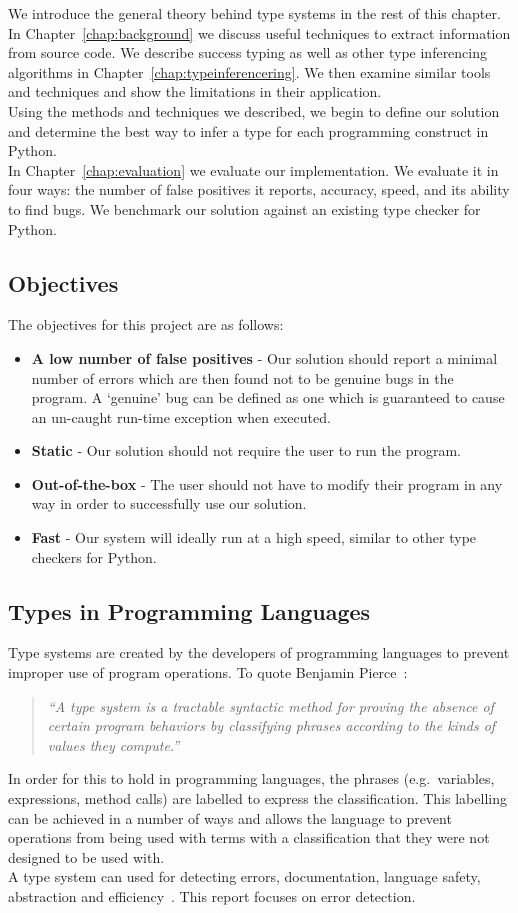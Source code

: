 \documentclass[12pt, titlepage]{article}
\begin{document}
\indent We introduce the general theory behind type systems in the rest of this chapter. In Chapter~\ref{chap:background} we discuss useful techniques to extract information from source code. We describe success typing as well as other type inferencing algorithms in Chapter~\ref{chap:typeinferencering}. We then examine similar tools and techniques and show the limitations in their application. \\
\indent Using the methods and techniques we described, we begin to define our solution and determine the best way to infer a type for each programming construct in Python. \\
\indent In Chapter~\ref{chap:evaluation} we evaluate our implementation. We evaluate it in four ways: the number of false positives it reports, accuracy, speed, and its ability to find bugs. We benchmark our solution against an existing type checker for Python.

\subsection{Objectives}
The objectives for this project are as follows:
\begin{itemize}
	\item \textbf{A low number of false positives} - Our solution should report a minimal number of errors which are then found not to be genuine bugs in the program. A `genuine' bug can be defined as one which is guaranteed to cause an un-caught run-time exception when executed.
	\item \textbf{Static} - Our solution should not require the user to run the program.
	\item \textbf{Out-of-the-box} - The user should not have to modify their program in any way in order to successfully use our solution.
	\item \textbf{Fast} - Our system will ideally run at a high speed, similar to other type checkers for Python.
\end{itemize} 

\subsection{Types in Programming Languages}
Type systems are created by the developers of programming languages to prevent improper use of program operations. To quote Benjamin Pierce~\cite{pierce02}:
\begin{quote}
	\emph{``A type system is a tractable syntactic method for proving the absence of certain program behaviors by classifying phrases according to the kinds of values they compute.''}
\end{quote}
In order for this to hold in programming languages, the phrases (e.g.\ variables, expressions, method calls) are labelled to express the classification. This labelling can be achieved in a number of ways and allows the language to prevent operations from being used with terms with a classification that they were not designed to be used with. \\
\indent A type system can used for detecting errors, documentation, language safety, abstraction and efficiency~\cite{pierce02}. This report focuses on error detection.
\end{document}
